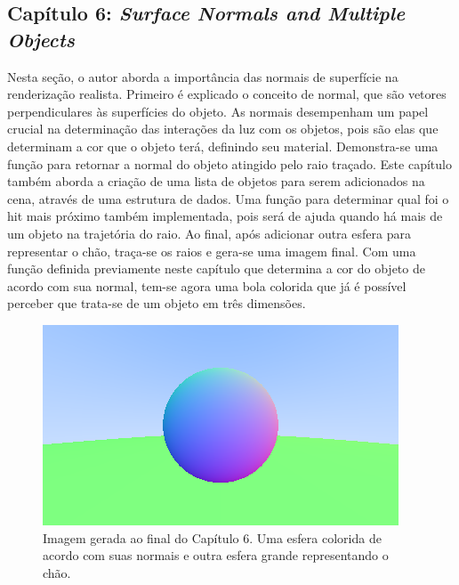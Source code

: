 \documentclass[journal]{IEEEtran}
\begin{document}
\subsection*{Capítulo 6: \emph{Surface Normals and Multiple Objects}}
Nesta seção, o autor aborda a importância das normais de superfície na renderização realista. Primeiro é
explicado o conceito de normal, que são vetores perpendiculares às superfícies do objeto. As normais 
desempenham um papel crucial na determinação das interações da luz com os objetos, pois são elas que
determinam a cor que o objeto terá, definindo seu material. Demonstra-se uma função para retornar a normal
do objeto atingido pelo raio traçado. Este capítulo também aborda a criação de uma lista de objetos para
serem adicionados na cena, através de uma estrutura de dados. Uma função para determinar qual foi o
hit mais próximo também implementada, pois será de ajuda quando há mais de um objeto na trajetória do raio.
Ao final, após adicionar outra esfera para representar o chão, traça-se os raios e gera-se uma imagem final.
Com uma função definida previamente neste capítulo que determina a cor do objeto de acordo com sua normal,
tem-se agora uma bola colorida que já é possível perceber que trata-se de um objeto em três dimensões.

\begin{figure}[ht]
  \centering
  \includegraphics[width=\linewidth]{media/img-1.05-normals-sphere-ground.png}
  \caption{Imagem gerada ao final do Capítulo 6. Uma esfera colorida de acordo com suas normais e outra
  esfera grande representando o chão.}
  \label{img_sphere_normals}
\end{figure}
\end{document}
